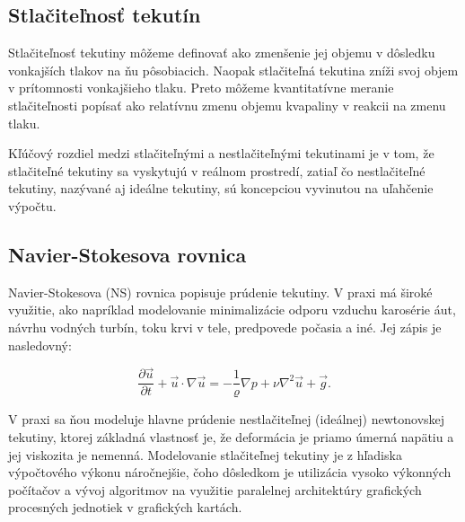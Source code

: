 \documentclass[]{tukediphc}
\begin{document}
\subsection{Stlačiteľnosť tekutín}

Stlačiteľnosť tekutiny môžeme definovať ako zmenšenie jej objemu v dôsledku vonkajších tlakov na ňu pôsobiacich. Naopak stlačiteľná tekutina zníži svoj objem v prítomnosti vonkajšieho tlaku. Preto môžeme kvantitatívne meranie stlačiteľnosti popísať ako relatívnu zmenu objemu kvapaliny v reakcii na zmenu tlaku.

Kľúčový rozdiel medzi stlačiteľnými a nestlačiteľnými tekutinami je v tom, že stlačiteľné tekutiny sa vyskytujú v reálnom prostredí, zatiaľ čo nestlačiteľné tekutiny, nazývané aj ideálne tekutiny, sú koncepciou vyvinutou na uľahčenie výpočtu.

%
%
%
%

\subsection{Navier-Stokesova rovnica}

Navier-Stokesova (NS) rovnica popisuje prúdenie tekutiny. V praxi má široké využitie, ako napríklad modelovanie minimalizácie odporu vzduchu karosérie áut, návrhu vodných turbín, toku krvi v tele, predpovede počasia a iné. Jej zápis je nasledovný:

\begin{equation}
\frac{\partial \vec{u}}{\partial t} + \vec{u} \cdot \nabla \vec{u} = - \frac{1}{\varrho} \nabla p + \nu \nabla^2 \vec{u} + \vec{g}.
\end{equation}

V praxi sa ňou modeluje hlavne prúdenie nestlačiteľnej (ideálnej) newtonovskej tekutiny, ktorej základná vlastnosť je, že deformácia je priamo úmerná napätiu a jej viskozita je nemenná. Modelovanie stlačiteľnej tekutiny je z hľadiska výpočtového výkonu náročnejšie, čoho dôsledkom je utilizácia vysoko výkonných počítačov a vývoj algoritmov na využitie paralelnej architektúry grafických procesných jednotiek v grafických kartách.
\end{document}
